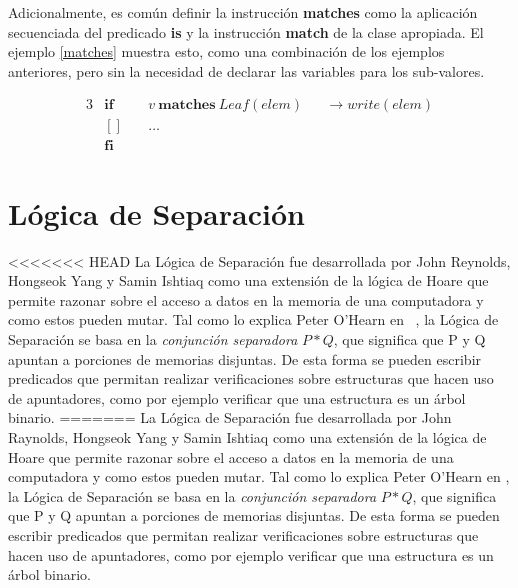 Adicionalmente, es común definir la instrucción \textbf{matches} 
como la aplicación secuenciada del predicado \textbf{is} y la instrucción
\textbf{match} de la clase apropiada. El ejemplo \ref{matches} muestra esto,
como una combinación de los ejemplos anteriores, pero sin la necesidad de
declarar las variables para los sub-valores.

\begin{alignat}{3}
&\boldsymbol{if}\ && v\ \boldsymbol{matches}\ Leaf(elem)         && \rightarrow write(elem) \nonumber \\
&\boldsymbol{[]}\ && \ldots                                                        \label{matches} \\
&\boldsymbol{fi} \nonumber
\end{alignat}


\section{Lógica de Separación}

<<<<<<< HEAD
La Lógica de Separación fue desarrollada por John Reynolds, Hongseok Yang y
Samin Ishtiaq \cite{seplogpaper1}\cite{seplogpaper2}\cite{seplogpaper3} como una
extensión de la lógica de Hoare que permite razonar sobre el acceso a datos en
la memoria de una computadora y como estos pueden mutar. Tal como lo explica
Peter O'Hearn en ~\cite{separation-logic}, la Lógica de Separación se basa en
la \textit{conjunción separadora} $P * Q$, que significa que P y Q apuntan a
porciones de memorias disjuntas. De esta forma se pueden escribir predicados
que permitan realizar verificaciones sobre estructuras que hacen uso de
apuntadores, como por ejemplo verificar que una estructura es un árbol
binario.
=======
La Lógica de Separación fue desarrollada por John Raynolds, Hongseok Yang y
Samin Ishtiaq  como una extensión de la lógica de
Hoare que permite razonar sobre el acceso a datos en la memoria de una
computadora y como estos pueden mutar. Tal como lo explica Peter O'Hearn en
, la Lógica de Separación se basa en la \textit{conjunción
separadora} $P * Q$, que significa que P y Q apuntan a porciones de memorias
disjuntas. De esta forma se pueden escribir predicados que permitan realizar
verificaciones sobre estructuras que hacen uso de apuntadores, como por
ejemplo verificar que una estructura es un árbol binario.

